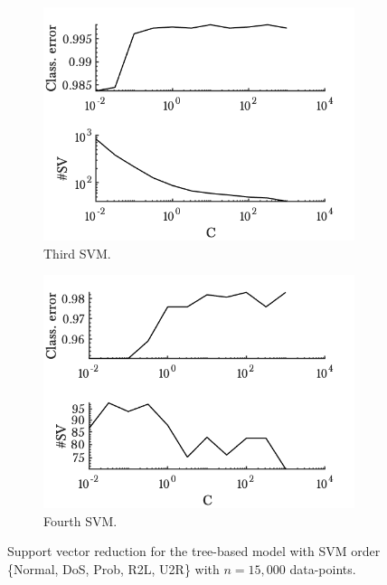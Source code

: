\begin{figure}[ht!]
\begin{subfigure}[b]{.47\textwidth}
            \centering 
            \includegraphics[width=.98\textwidth]{parts/chap-4/img-svm/non-lin/svm3.png}
            \caption{Third SVM.} 
        \end{subfigure}
        \hfill
        \begin{subfigure}[b]{.47\textwidth}   
            \centering 
            \includegraphics[width=.98\textwidth]{parts/chap-4/img-svm/non-lin/svm4.png}
            \caption{Fourth SVM.} 
        \end{subfigure}
        \caption{Support vector reduction for the tree-based model with SVM order \{Normal, DoS, Prob, R2L, U2R\} with $n=15,000$ data-points.}
        \label{fig:svm-nl-red}
\end{figure}

